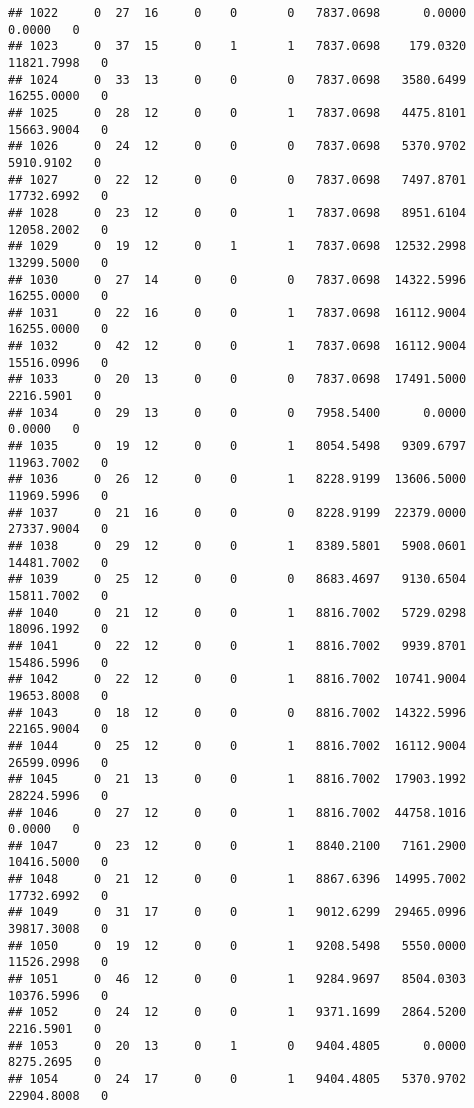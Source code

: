 \documentclass[
]{article}
\begin{document}
\begin{enumerate}
\begin{verbatim}
## 1022     0  27  16     0    0       0   7837.0698      0.0000      0.0000   0
## 1023     0  37  15     0    1       1   7837.0698    179.0320  11821.7998   0
## 1024     0  33  13     0    0       0   7837.0698   3580.6499  16255.0000   0
## 1025     0  28  12     0    0       1   7837.0698   4475.8101  15663.9004   0
## 1026     0  24  12     0    0       0   7837.0698   5370.9702   5910.9102   0
## 1027     0  22  12     0    0       0   7837.0698   7497.8701  17732.6992   0
## 1028     0  23  12     0    0       1   7837.0698   8951.6104  12058.2002   0
## 1029     0  19  12     0    1       1   7837.0698  12532.2998  13299.5000   0
## 1030     0  27  14     0    0       0   7837.0698  14322.5996  16255.0000   0
## 1031     0  22  16     0    0       1   7837.0698  16112.9004  16255.0000   0
## 1032     0  42  12     0    0       1   7837.0698  16112.9004  15516.0996   0
## 1033     0  20  13     0    0       0   7837.0698  17491.5000   2216.5901   0
## 1034     0  29  13     0    0       0   7958.5400      0.0000      0.0000   0
## 1035     0  19  12     0    0       1   8054.5498   9309.6797  11963.7002   0
## 1036     0  26  12     0    0       1   8228.9199  13606.5000  11969.5996   0
## 1037     0  21  16     0    0       0   8228.9199  22379.0000  27337.9004   0
## 1038     0  29  12     0    0       1   8389.5801   5908.0601  14481.7002   0
## 1039     0  25  12     0    0       0   8683.4697   9130.6504  15811.7002   0
## 1040     0  21  12     0    0       1   8816.7002   5729.0298  18096.1992   0
## 1041     0  22  12     0    0       1   8816.7002   9939.8701  15486.5996   0
## 1042     0  22  12     0    0       1   8816.7002  10741.9004  19653.8008   0
## 1043     0  18  12     0    0       0   8816.7002  14322.5996  22165.9004   0
## 1044     0  25  12     0    0       1   8816.7002  16112.9004  26599.0996   0
## 1045     0  21  13     0    0       1   8816.7002  17903.1992  28224.5996   0
## 1046     0  27  12     0    0       1   8816.7002  44758.1016      0.0000   0
## 1047     0  23  12     0    0       1   8840.2100   7161.2900  10416.5000   0
## 1048     0  21  12     0    0       1   8867.6396  14995.7002  17732.6992   0
## 1049     0  31  17     0    0       1   9012.6299  29465.0996  39817.3008   0
## 1050     0  19  12     0    0       1   9208.5498   5550.0000  11526.2998   0
## 1051     0  46  12     0    0       1   9284.9697   8504.0303  10376.5996   0
## 1052     0  24  12     0    0       1   9371.1699   2864.5200   2216.5901   0
## 1053     0  20  13     0    1       0   9404.4805      0.0000   8275.2695   0
## 1054     0  24  17     0    0       1   9404.4805   5370.9702  22904.8008   0

\end{verbatim}
\end{enumerate}
\end{document}
